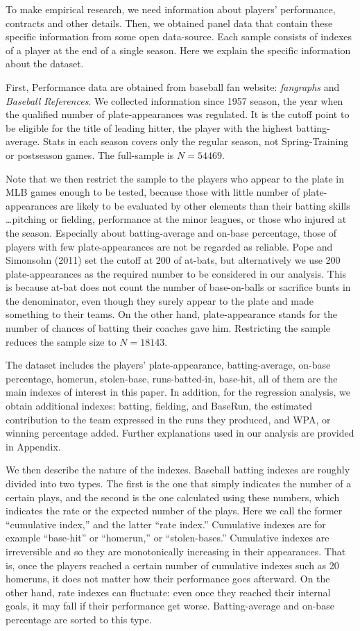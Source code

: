 \documentclass[dvipdfmx, 12pt]{article}
\begin{document}
To make empirical research, we need information about players' performance, contracts and other details. Then, we obtained panel data that contain these specific information from some open data-source. Each sample consists of indexes of a player at the end of a single season. Here we explain the specific information about the dataset.

First, Performance data are obtained from baseball fan website:  \textit{fangraphs} and \textit{Baseball References}. We collected information since 1957 season, the year when the qualified number of plate-appearances was regulated. It is the cutoff point to be eligible for the title of leading hitter, the player with the highest batting-average. Stats in each season covers only the regular season, not Spring-Training or postseason games. The full-sample is $N=54469$.

Note that we then restrict the sample to the players who appear to the plate in MLB games enough to be tested, because those with little number of plate-appearances are likely to be evaluated by other elements than their batting skills \ldots pitching or fielding, performance at the minor leagues, or those who injured at the season. Especially about batting-average and on-base percentage, those of players with few plate-appearances are not be regarded as reliable. Pope and Simonsohn (2011) set the cutoff at 200 of at-bats, but alternatively we use 200 plate-appearances as the required number to be considered in our analysis. This is because at-bat does not count the number of base-on-balls or sacrifice bunts in the denominator, even though they surely appear to the plate and made something to their teams. On the other hand, plate-appearance stands for the number of chances of batting their coaches gave him. Restricting the sample reduces the sample size to $N=18143$.

The dataset includes the players' plate-appearance, batting-average, on-base percentage, homerun, stolen-base, runs-batted-in, base-hit, all of them are the main indexes of interest in this paper. In addition, for the regression analysis, we obtain additional indexes: batting, fielding, and BaseRun, the estimated contribution to the team expressed in the runs they produced, and WPA, or winning percentage added. Further explanations used in our analysis are provided in Appendix.

We then describe the nature of the indexes. Baseball batting indexes are roughly divided into two types. The first is the one that simply indicates the number of a certain plays, and the second is the one calculated using these numbers, which indicates the rate or the expected number of the plays. Here we call the former ``cumulative index,'' and the latter ``rate index.'' Cumulative indexes are for example ``base-hit'' or ``homerun,'' or ``stolen-bases.'' Cumulative indexes are irreversible and so they are monotonically increasing in their appearances. That is, once the players reached a certain number of cumulative indexes such as 20 homeruns, it does not matter how their performance goes afterward. On the other hand, rate indexes can fluctuate: even once they reached their internal goals, it may fall if their performance get worse. Batting-average and on-base percentage are sorted to this type.
\end{document}
